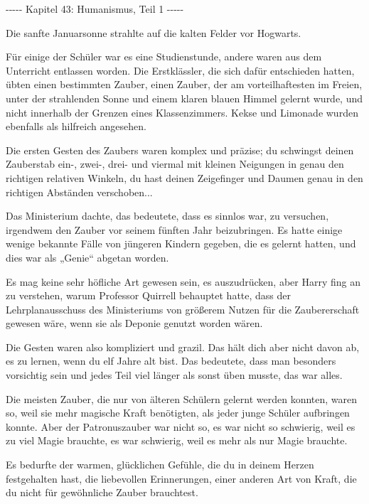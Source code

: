 

\hypertarget{humanismus-teil-1}{%

-\/-\/-\/-\/- Kapitel 43: Humanismus, Teil 1 -\/-\/-\/-\/-

Die sanfte Januarsonne strahlte auf die kalten Felder vor Hogwarts.

Für einige der Schüler war es eine Studienstunde, andere waren aus dem Unterricht entlassen worden. Die Erstklässler, die sich dafür entschieden hatten, übten einen bestimmten Zauber, einen Zauber, der am vorteilhaftesten im Freien, unter der strahlenden Sonne und einem klaren blauen Himmel gelernt wurde, und nicht innerhalb der Grenzen eines Klassenzimmers. Kekse und Limonade wurden ebenfalls als hilfreich angesehen.

Die ersten Gesten des Zaubers waren komplex und präzise; du schwingst deinen Zauberstab ein-, zwei-, drei- und viermal mit kleinen Neigungen in genau den richtigen relativen Winkeln, du hast deinen Zeigefinger und Daumen genau in den richtigen Abständen verschoben...

Das Ministerium dachte, das bedeutete, dass es sinnlos war, zu versuchen, irgendwem den Zauber vor seinem fünften Jahr beizubringen. Es hatte einige wenige bekannte Fälle von jüngeren Kindern gegeben, die es gelernt hatten, und dies war als „Genie“ abgetan worden.

Es mag keine sehr höfliche Art gewesen sein, es auszudrücken, aber Harry fing an zu verstehen, warum Professor Quirrell behauptet hatte, dass der Lehrplanausschuss des Ministeriums von größerem Nutzen für die Zaubererschaft gewesen wäre, wenn sie als Deponie genutzt worden wären.

Die Gesten waren also kompliziert und grazil. Das hält dich aber nicht davon ab, es zu lernen, wenn du elf Jahre alt bist. Das bedeutete, dass man besonders vorsichtig sein und jedes Teil viel länger als sonst üben musste, das war alles.

Die meisten Zauber, die nur von älteren Schülern gelernt werden konnten, waren so, weil sie mehr magische Kraft benötigten, als jeder junge Schüler aufbringen konnte. Aber der Patronuszauber war nicht so, es war nicht so schwierig, weil es zu viel Magie brauchte, es war schwierig, weil es mehr als nur Magie brauchte.

Es bedurfte der warmen, glücklichen Gefühle, die du in deinem Herzen festgehalten hast, die liebevollen Erinnerungen, einer anderen Art von Kraft, die du nicht für gewöhnliche Zauber brauchtest.

}

